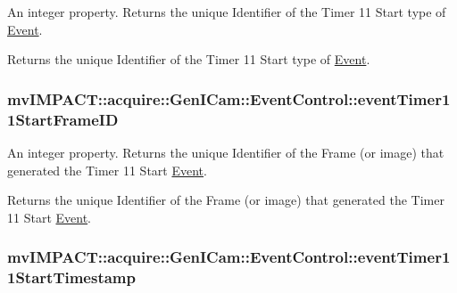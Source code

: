 An integer property. Returns the unique Identifier of the Timer 11 Start type of \hyperlink{classmv_i_m_p_a_c_t_1_1acquire_1_1_event}{Event}. 

Returns the unique Identifier of the Timer 11 Start type of \hyperlink{classmv_i_m_p_a_c_t_1_1acquire_1_1_event}{Event}. \hypertarget{classmv_i_m_p_a_c_t_1_1acquire_1_1_gen_i_cam_1_1_event_control_a35777e569a5e1cf4a5f1af35cca9f6d6}{
\subsubsection[{event\+Timer11\+Start\+Frame\+I\+D}]{ mv\+I\+M\+P\+A\+C\+T\+::acquire\+::\+Gen\+I\+Cam\+::\+Event\+Control\+::event\+Timer11\+Start\+Frame\+I\+D}}\label{classmv_i_m_p_a_c_t_1_1acquire_1_1_gen_i_cam_1_1_event_control_a35777e569a5e1cf4a5f1af35cca9f6d6}


An integer property. Returns the unique Identifier of the Frame (or image) that generated the Timer 11 Start \hyperlink{classmv_i_m_p_a_c_t_1_1acquire_1_1_event}{Event}. 

Returns the unique Identifier of the Frame (or image) that generated the Timer 11 Start \hyperlink{classmv_i_m_p_a_c_t_1_1acquire_1_1_event}{Event}. \hypertarget{classmv_i_m_p_a_c_t_1_1acquire_1_1_gen_i_cam_1_1_event_control_abc8a5cc60fa9eb806ea081232e921015}{
\subsubsection[{event\+Timer11\+Start\+Timestamp}]{ mv\+I\+M\+P\+A\+C\+T\+::acquire\+::\+Gen\+I\+Cam\+::\+Event\+Control\+::event\+Timer11\+Start\+Timestamp}}\label{classmv_i_m_p_a_c_t_1_1acquire_1_1_gen_i_cam_1_1_event_control_abc8a5cc60fa9eb806ea081232e921015}


